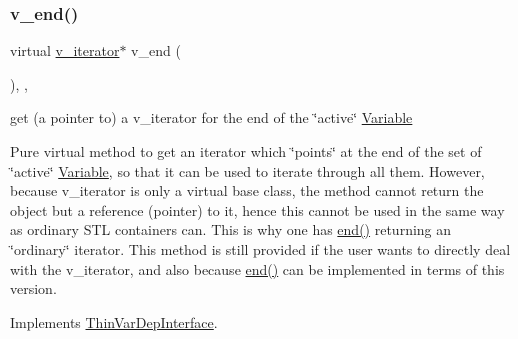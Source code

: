 \subsubsection{\texorpdfstring{v\+\_\+end()}{v\_end()}\hspace{0.1cm}{\footnotesize\ttfamily [1/2]}}
{\footnotesize\ttfamily virtual \mbox{\hyperlink{class_s_m_spp__di__unipi__it_1_1_thin_var_dep_interface_1_1v__iterator}{v\+\_\+iterator}}$\ast$ v\+\_\+end (\begin{DoxyParamCaption}\item[{void}]{ }\end{DoxyParamCaption})\hspace{0.3cm}{\ttfamily [inline]}, {\ttfamily [override]}, {\ttfamily [virtual]}}



get (a pointer to) a v\+\_\+iterator for the end of the \char`\"{}active\char`\"{} \mbox{\hyperlink{class_s_m_spp__di__unipi__it_1_1_variable}{Variable}} 

Pure virtual method to get an iterator which \char`\"{}points\char`\"{} at the end of the set of \char`\"{}active\char`\"{} \mbox{\hyperlink{class_s_m_spp__di__unipi__it_1_1_variable}{Variable}}, so that it can be used to iterate through all them. However, because v\+\_\+iterator is only a virtual base class, the method cannot return the object but a reference (pointer) to it, hence this cannot be used in the same way as ordinary S\+TL containers can. This is why one has \mbox{\hyperlink{group___thin_var_dep_interface___c_l_a_s_s_e_s_gae1175d5cbc6627e3e49ed9bcb58ffce9}{end()}} returning an \char`\"{}ordinary\char`\"{} iterator. This method is still provided if the user wants to directly deal with the v\+\_\+iterator, and also because \mbox{\hyperlink{group___thin_var_dep_interface___c_l_a_s_s_e_s_gae1175d5cbc6627e3e49ed9bcb58ffce9}{end()}} can be implemented in terms of this version. 

Implements \mbox{\hyperlink{group___thin_var_dep_interface___c_l_a_s_s_e_s_ga422dd4393326b2da21dbef0aa0a85bee}{Thin\+Var\+Dep\+Interface}}.

\mbox{\label{class_s_m_spp__di__unipi__it_1_1_f_row_constraint_a17969277c912e791df025c9bebda3217}} 
